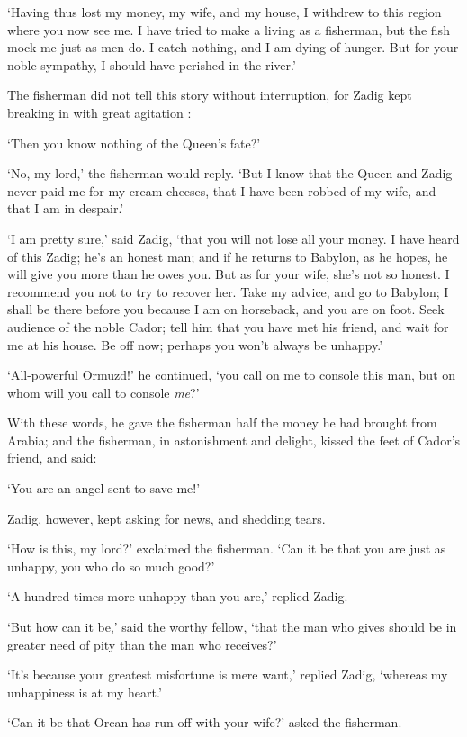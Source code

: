 \documentclass{article}
\begin{document}
\begin{center}
`Having thus lost my money, my wife, and my house, I withdrew to this region where 
you now see me. I have tried to make a living as a fisherman, but the fish mock 
me just as men do. I catch nothing, and I am dying of hunger. But for your noble 
sympathy, I should have perished in the river.' 

The fisherman did not tell this story without interruption, for Zadig kept breaking 
in with great agitation : 

`Then you know nothing of the Queen's fate?' 

`No, my lord,' the fisherman would reply. `But I know that the Queen and Zadig 
never paid me for my cream cheeses, that I have been robbed of my wife, and that 
I am in despair.' 

`I am pretty sure,' said Zadig, `that you will not lose all your money. I have 
heard of this Zadig; he's an honest man; and if he returns to Babylon, as he hopes, 
he will give you more than he owes you. But as for your wife, she's not so honest. 
I recommend you not to try to recover her. Take my advice, and go to Babylon; I 
shall be there before you because I am on horseback, and you are on foot. Seek 
audience of the noble Cador; tell him that you have met his friend, and wait for 
me at his house. Be off now; perhaps you won't always be unhappy.' 

`All-powerful Ormuzd!' he continued, `you call on me to console this man, but on 
whom will you call to console \textit{me}?' 

With these words, he gave the fisherman half the money he had brought from Arabia; 
and the fisherman, in astonishment and delight, kissed the feet of Cador's friend, 
and said: 

`You are an angel sent to save me!' 

Zadig, however, kept asking for news, and shedding tears. 

`How is this, my lord?' exclaimed the fisherman. `Can it be that you are just as 
unhappy, you who do so much good?' 

`A hundred times more unhappy than you are,' replied Zadig. 

`But how can it be,' said the worthy fellow, `that the man who gives should be 
in greater need of pity than the man who receives?' 

`It's because your greatest misfortune is mere want,' replied Zadig, `whereas my 
unhappiness is at my heart.' 

`Can it be that Orcan has run off with your wife?' asked the fisherman. 


\end{center}
\end{document}
